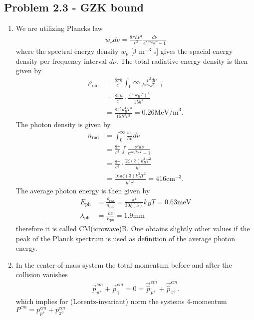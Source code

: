 \documentclass[../main.tex]{subfiles}
\begin{document}
\subsection{Problem 2.3 - GZK bound}
\begin{enumerate}
    \item We are utilizing Plancks law
    \begin{align}
        w_\nu d\nu = \frac{8\pi h\nu^3}{c^3}\frac{d\nu}{e^{h\nu/k_BT}-1}
    \end{align}
    where the spectral energy density $w_\nu$ [J m$^{-3}$ s] gives the spacial energy density per frequency interval $d\nu$. The total radiative energy density is then given by
    \begin{align}
        \rho_\text{rad} &= \frac{8\pi h}{c^3}\int_0\infty \frac{\nu^3d\nu}{e^{h\nu/k_BT}-1}\\
        &=\frac{8\pi h}{c^3}\cdot\frac{(\pi k_B T)^4}{15h^4}\\
        &=\frac{8\pi^5k_B^4 T^4}{15h^3 c^3}=0.26\text{MeV/m}^3.
    \end{align}
    The photon density is given by
    \begin{align}
        n_\text{rad} &=\int_0^\infty\frac{w_\nu}{h\nu}d\nu\\
        &= \frac{8\pi}{c^3}\int \frac{\nu^2d\nu}{e^{h\nu/k_BT}-1}\\
        &=\frac{8\pi}{c^3}\cdot\frac{2\zeta(3) k_B^3 T^3}{h^3}\\
        &=\frac{16\pi\zeta(3) k_B^3 T^3}{h^3c^3}=416\text{cm}^{-3}.
    \end{align}
    The average photon energy is then given by
    \begin{align}
        E_\text{ph}&=\frac{\rho_\text{rad}}{n_\text{rad}}=\frac{\pi^4}{30\zeta(3)}k_BT=0.63\text{meV}\\
        \lambda_\text{ph}&=\frac{hc}{E_\text{ph}}=1.9\text{mm}
    \end{align}
    therefore it is called CM(icrowave)B.
    One obtains slightly other values if the peak of the Planck spectrum is used as definition of the average photon energy.
    \item In the center-of-mass system the total momentum before and after the collision vanishes
    \begin{align}
        \vec{p}_{p^+}^{cm}+\vec{p}_\gamma^{cm}=0=\vec{\hat{p}}_{p^+}^{cm}+\vec{\hat{p}}_{\pi^0}^{cm}.
    \end{align}
    which implies for (Lorentz-invariant) norm the systems 4-momentum $P^{cm}=p_{p^+}^{cm}+p_{\pi^0}^{cm}$

\end{enumerate}
\end{document}
